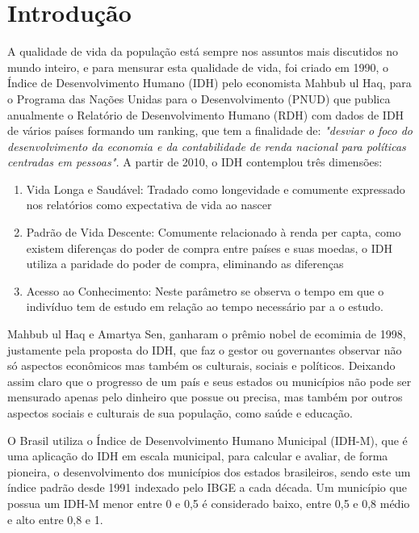 \documentclass[journal]{IEEEtran}
\begin{document}
\section{Introdução}
A qualidade de vida da população está sempre nos assuntos mais discutidos no mundo inteiro, e para mensurar esta qualidade de vida, foi criado em 1990, o Índice de Desenvolvimento Humano (IDH) pelo economista Mahbub ul Haq\cite{PNUD2017}\cite{Licia2009}\cite{loureiroimpacto}, para o Programa das Nações Unidas para o Desenvolvimento (PNUD) que publica anualmente o Relatório de Desenvolvimento Humano (RDH) com dados de IDH de vários países formando um ranking\cite{PNUD2017}, que tem a finalidade de: \emph{"desviar o foco do desenvolvimento da economia e da contabilidade de renda nacional para políticas centradas em pessoas\cite{Haq1995}".}
A partir de 2010, o IDH contemplou três dimensões\cite{Atlas2017}\cite{Licia2009}: 
\begin{enumerate}
\item  {Vida Longa e Saudável: Tradado como longevidade e comumente expressado nos relatórios como expectativa de vida ao nascer}
\item  {Padrão de Vida Descente: Comumente relacionado à renda per capta, como existem diferenças do poder de compra entre países e suas moedas, o IDH utiliza a paridade do poder de compra, eliminando as diferenças}
\item  {Acesso ao Conhecimento: Neste parâmetro se observa o tempo em que o indivíduo tem de estudo em relação ao tempo  necessário par a o estudo.}
\end{enumerate}

Mahbub ul Haq e Amartya Sen, ganharam o prêmio nobel de ecomimia de 1998\cite{Licia2009}\cite{PNUD2017}, justamente pela proposta do IDH, que faz o gestor ou governantes observar não só aspectos econômicos mas também os culturais, sociais e políticos. Deixando assim claro que o progresso de um país e seus estados ou municípios não pode ser mensurado apenas pelo dinheiro que possue ou precisa, mas também por outros aspectos sociais e culturais de sua população, como saúde e educação.

O Brasil utiliza o Índice de Desenvolvimento Humano Municipal (IDH-M), que é uma aplicação do IDH em escala municipal, para calcular e avaliar, de forma pioneira, o desenvolvimento dos municípios dos estados brasileiros, sendo este um índice padrão desde 1991 indexado pelo IBGE a cada década. Um município que possua um IDH-M menor entre 0 e 0,5 é considerado baixo, entre 0,5 e 0,8 médio e alto entre 0,8 e 1.\cite{IBGE2017}\cite{Atlas2017}
\end{document}
